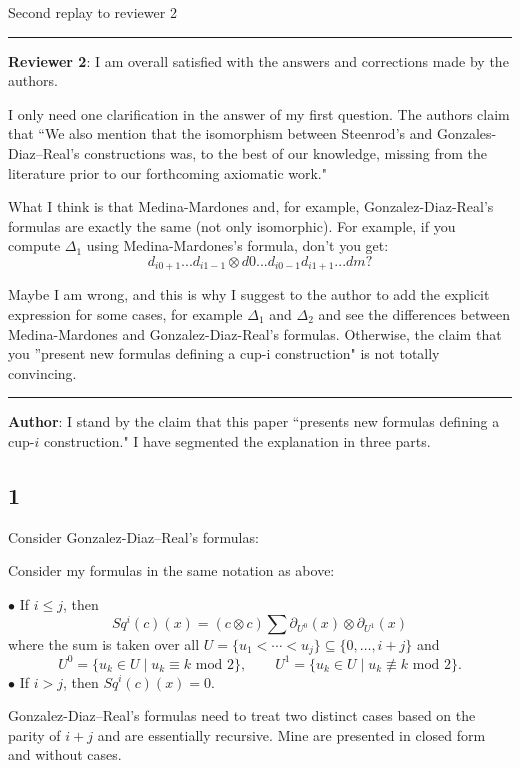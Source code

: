 \documentclass{amsart}
\begin{document}
	\thispagestyle{empty}
	\begin{center}
		\Huge{Second replay to reviewer 2}
		\large{}
	\end{center}

	\vspace*{5pt}
	\noindent\rule{\textwidth}{1pt}

	\noindent\textbf{Reviewer 2}:
	I am overall satisfied with the answers and corrections made by the authors.

	I only need one clarification in the answer of my first question.
	The authors claim that ``We also mention that the isomorphism between Steenrod's and Gonzales-Diaz--Real's constructions was, to the best of our knowledge, missing from the literature prior to our forthcoming axiomatic work."

	What I think is that Medina-Mardones and, for example, Gonzalez-Diaz-Real's formulas are exactly the same (not only isomorphic).
	For example, if you compute $\Delta_1$ using Medina-Mardones's formula, don't you get:
	\[
	d_{i0+1}...d_{i1-1} \otimes d0...d_{i0-1}d_{i1+1}...dm ?
	\]

	Maybe I am wrong, and this is why I suggest to the author to add the explicit expression for some cases, for example $\Delta_1$ and $\Delta_2$ and see the differences between Medina-Mardones and Gonzalez-Diaz-Real's formulas.
	Otherwise, the claim that you ''present new formulas defining a cup-i construction" is not totally convincing.

	\noindent\rule{\textwidth}{1pt}

	\newpage
	\noindent\textbf{Author}:
	I stand by the claim that this paper ``presents new formulas defining a cup-$i$ construction." I have segmented the explanation in three parts.

	\subsection*{1} Consider Gonzalez-Diaz--Real's formulas:
	\begin{center}
		\vspace*{-10pt}
	\end{center}
	Consider my formulas in the same notation as above:
	\begin{framed}
		\noindent$\bullet$ If $i \leq j$, then
		\[
		Sq^i(c)(x) = (c \otimes c) \sum \partial_{U^0}(x) \otimes \partial_{U^1}(x)
		\]
		where the sum is taken over all $U = \{u_1 < \cdots < u_{j}\} \subseteq \{0, \dots, i+j\}$ and
		\begin{equation*}
			U^0 = \{u_k \in U \mid u_k \equiv k \text{ mod } 2\}, \qquad
			U^1 = \{u_k \in U \mid u_k \not\equiv k \text{ mod } 2\}.
		\end{equation*}
		\noindent$\bullet$ If $i > j$, then $Sq^i(c)(x) = 0$.
	\end{framed}
	Gonzalez-Diaz--Real's formulas need to treat two distinct cases based on the parity of $i+j$ and are essentially recursive.
	Mine are presented in closed form and without cases.
\end{document}
